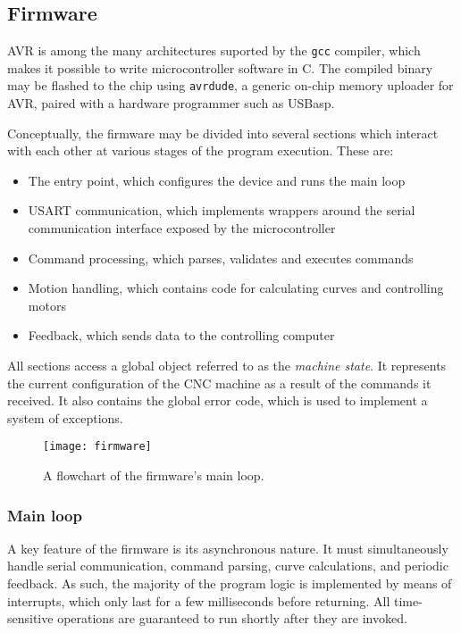 \subsection{Firmware}

AVR is among the many architectures suported by the \texttt{gcc} compiler,
which makes it possible to write microcontroller software in C. The compiled
binary may be flashed to the chip using \texttt{avrdude}, a generic
on-chip memory uploader for AVR, paired with a hardware programmer such as
USBasp.

Conceptually, the firmware may be divided into several sections which interact
with each other at various stages of the program execution. These are:
\begin{itemize}
    \item The entry point, which configures the device and runs the main loop
    \item USART communication, which implements wrappers around the serial
    communication interface exposed by the microcontroller
    \item Command processing, which parses, validates and executes commands
    \item Motion handling, which contains code for calculating curves and
    controlling motors
    \item Feedback, which sends data to the controlling computer
\end{itemize}
All sections access a global object referred to as the \textit{machine state}.
It represents the current configuration of the CNC machine as a result of the
commands it received. It also contains the global error code, which is used to
implement a system of exceptions.

\begin{figure}[ht]
    \begin{center}
        \texttt{[image: firmware]}
        \caption{A flowchart of the firmware's main loop.}
    \end{center}
\end{figure}

\subsubsection{Main loop}

A key feature of the firmware is its asynchronous nature. It must simultaneously
handle serial communication, command parsing, curve calculations, and periodic
feedback. As such, the majority of the program logic is implemented by means of
interrupts, which only last for a few milliseconds before returning. All
time-sensitive operations are guaranteed to run shortly after they are invoked.

